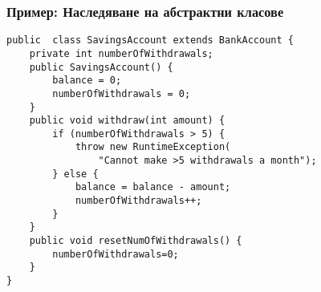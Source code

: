 \documentclass[ignorenonframetext, hyperref=unicode,compress]{beamer}
\begin{document}
\begin{frame}[containsverbatim]\frametitle{Пример: Наследяване на абстрактни класове}
\begin{lstlisting}
public  class SavingsAccount extends BankAccount {
 	private int numberOfWithdrawals;
 	public SavingsAccount() {
 		balance = 0;
 		numberOfWithdrawals = 0;
	}
 	public void withdraw(int amount) {
 		if (numberOfWithdrawals > 5) {
 			throw new RuntimeException(
				"Cannot make >5 withdrawals a month");
 		} else {
 			balance = balance - amount;
 			numberOfWithdrawals++;
		}
	}
 	public void resetNumOfWithdrawals() {
		numberOfWithdrawals=0;
	}
}
\end{lstlisting}
\end{frame}
\end{document}

